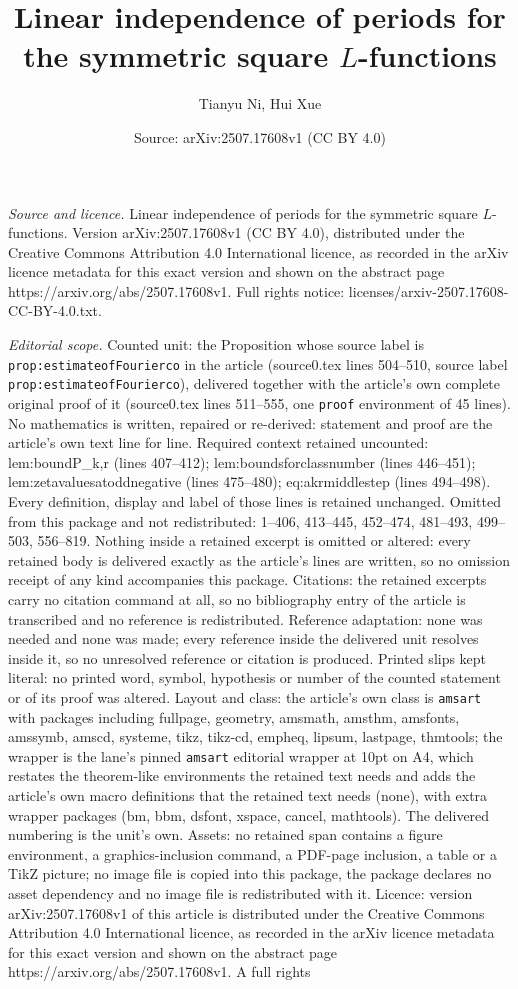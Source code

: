 \documentclass[10pt,a4paper]{amsart}
\title[Linear independence of periods for the symmetric square $L$-]{Linear independence of periods for the symmetric square $L$-functions}
\author{Tianyu Ni, Hui Xue}
\date{Source: arXiv:2507.17608v1 (CC BY 4.0)}
\begin{document}
\maketitle

\noindent\emph{Source and licence.} Linear independence of periods for the symmetric square $L$-functions. Version arXiv:2507.17608v1 (CC BY 4.0), distributed under the Creative Commons Attribution 4.0 International licence, as recorded in the arXiv licence metadata for this exact version and shown on the abstract page https://arxiv.org/abs/2507.17608v1. Full rights notice: licenses/arxiv-2507.17608-CC-BY-4.0.txt.\par\smallskip

\noindent\textit{Editorial scope.} Counted unit: the Proposition whose source label is \texttt{prop:estimateofFourierco} in the article (source0.tex lines 504--510, source label \texttt{prop:estimateofFourierco}), delivered together with the article's own complete original proof of it (source0.tex lines 511--555, one \texttt{proof} environment of 45 lines). No mathematics is written, repaired or re-derived: statement and proof are the article's own text line for line. Required context retained uncounted: lem:boundP\_k,r (lines 407--412); lem:boundsforclassnumber (lines 446--451); lem:zetavaluesatoddnegative (lines 475--480); eq:akrmiddlestep (lines 494--498). Every definition, display and label of those lines is retained unchanged. Omitted from this package and not redistributed: 1--406, 413--445, 452--474, 481--493, 499--503, 556--819. Nothing inside a retained excerpt is omitted or altered: every retained body is delivered exactly as the article's lines are written, so no omission receipt of any kind accompanies this package. Citations: the retained excerpts carry no citation command at all, so no bibliography entry of the article is transcribed and no reference is redistributed. Reference adaptation: none was needed and none was made; every reference inside the delivered unit resolves inside it, so no unresolved reference or citation is produced. Printed slips kept literal: no printed word, symbol, hypothesis or number of the counted statement or of its proof was altered. Layout and class: the article's own class is \texttt{amsart} with packages including fullpage, geometry, amsmath, amsthm, amsfonts, amssymb, amscd, systeme, tikz, tikz-cd, empheq, lipsum, lastpage, thmtools; the wrapper is the lane's pinned \texttt{amsart} editorial wrapper at 10pt on A4, which restates the theorem-like environments the retained text needs and adds the article's own macro definitions that the retained text needs (none), with extra wrapper packages (bm, bbm, dsfont, xspace, cancel, mathtools). The delivered numbering is the unit's own. Assets: no retained span contains a figure environment, a graphics-inclusion command, a PDF-page inclusion, a table or a TikZ picture; no image file is copied into this package, the package declares no asset dependency and no image file is redistributed with it. Licence: version arXiv:2507.17608v1 of this article is distributed under the Creative Commons Attribution 4.0 International licence, as recorded in the arXiv licence metadata for this exact version and shown on the abstract page https://arxiv.org/abs/2507.17608v1. A full rights 
\end{document}
